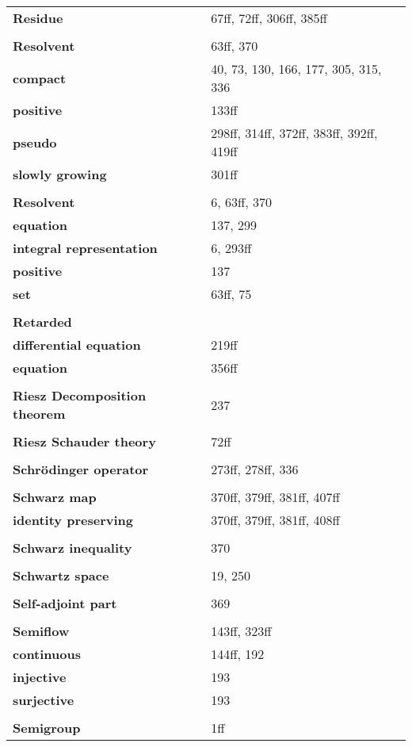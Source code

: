 \documentclass[10pt]{scrartcl}
\begin{document}
\begin{longtable}{>{\bfseries}p{6cm}p{8cm}}
\\
\textbf{Residue} & 67ff, 72ff, 306ff, 385ff \\
\\
\textbf{Resolvent} & 63ff, 370 \\
\quad compact & 40, 73, 130, 166, 177, 305, 315, 336 \\
\quad positive & 133ff \\
\quad pseudo & 298ff, 314ff, 372ff, 383ff, 392ff, 419ff \\
\quad slowly growing & 301ff \\
\\
\textbf{Resolvent} & 6, 63ff, 370 \\
\quad equation & 137, 299 \\
\quad integral representation & 6, 293ff \\
\quad positive & 137 \\
\quad set & 63ff, 75 \\
\\
\textbf{Retarded} & \\
\quad differential equation & 219ff \\
\quad equation & 356ff \\
\\
\textbf{Riesz Decomposition theorem} & 237 \\
\\
\textbf{Riesz Schauder theory} & 72ff \\
\\
\textbf{Schrödinger operator} & 273ff, 278ff, 336 \\
\\
\textbf{Schwarz map} & 370ff, 379ff, 381ff, 407ff \\
\quad identity preserving & 370ff, 379ff, 381ff, 408ff \\
\\
\textbf{Schwarz inequality} & 370 \\
\\
\textbf{Schwartz space} & 19, 250 \\
\\
\textbf{Self-adjoint part} & 369 \\
\\
\textbf{Semiflow} & 143ff, 323ff \\
\quad continuous & 144ff, 192 \\
\quad injective & 193 \\
\quad surjective & 193 \\
\\
\textbf{Semigroup} & 1ff \\

\end{longtable}
\end{document}
